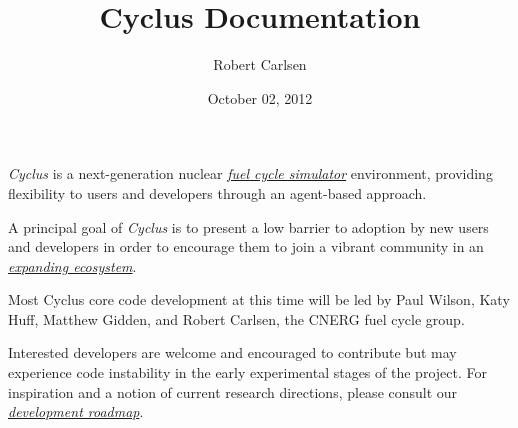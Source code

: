 \documentclass[letterpaper,10pt,english]{sphinxmanual}
\title{Cyclus Documentation}
\date{October 02, 2012}
\author{Robert Carlsen}
\begin{document}
\maketitle
\tableofcontents
{}\label{index::doc}


\emph{Cyclus} is a next-generation nuclear {\hyperref[basics/fcs_background::doc]{\emph{fuel cycle simulator}}} environment, providing flexibility to users
and developers through an agent-based approach.

A principal goal of \emph{Cyclus} is to present a
low barrier to adoption by new users and developers in order to
encourage them to join a vibrant community in an {\hyperref[basics/ecosystem::doc]{\emph{expanding ecosystem}}}.

Most Cyclus core code development at this time will be led by Paul Wilson,
Katy Huff, Matthew Gidden, and Robert Carlsen, the CNERG fuel cycle group.

Interested developers are welcome and encouraged to contribute but may
experience code instability in the early experimental stages of
the project. For inspiration and a notion of current research directions,
please consult our {\hyperref[basics/roadmap::doc]{\emph{development roadmap}}}.
\end{document}
